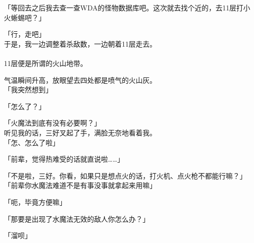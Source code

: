 「等回去之后我去查一查WDA的怪物数据库吧。这次就去找个近的，去11层打小火蜥蜴吧？」

「行，走吧」\\

于是，我一边调整着杀敌数，一边朝着11层走去。\\

\sqsplit\\

11层便是所谓的火山地带。

气温瞬间升高，放眼望去四处都是喷气的火山灰。\\

「我突然想到」

「怎么了？」

「火魔法到底有没有必要啊？」\\

听见我的话，三好叉起了手，满脸无奈地看着我。\\

「怎、怎么了啦」

「前辈，觉得热难受的话就直说啦……」

「不是啦，三好。你看，如果只是想点火的话，打火机、点火枪不都能行嘛？」\\

「前辈你水魔法难道不是有事没事就拿起来用嘛」

「呃，毕竟方便嘛」

「那要是出现了水魔法无效的敌人你怎么办？」

「溜呗」\\

